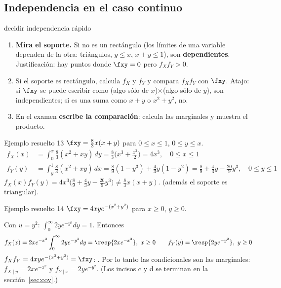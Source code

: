 \subsection{Independencia en el caso continuo}

\begin{receta}{decidir independencia r\'apido}
\begin{enumerate}
\item \textbf{Mira el soporte.} Si no es un rect\'angulo (los l\'imites de una variable dependen de la otra:
tri\'angulos, $y\le x$, $x+y\le1$), son \textbf{dependientes}. Justificaci\'on: hay puntos donde $\fxy=0$ pero $f_Xf_Y>0$.
\item Si el soporte es rect\'angulo, calcula $f_X$ y $f_Y$ y compara $f_Xf_Y$ con $\fxy$.
Atajo: si $\fxy$ se puede escribir como (algo s\'olo de $x$)$\times$(algo s\'olo de $y$), son independientes; si es una suma como $x+y$ o $x^2+y^2$, no.
\item En el examen \textbf{escribe la comparaci\'on}: calcula las marginales y muestra el producto.
\end{enumerate}
\end{receta}

\begin{ejemplo}{Ejemplo resuelto 13 }
$\fxy=\tfrac83x(x+y)$ para $0\le x\le1$, $0\le y\le x$.
\begin{align*}
f_X(x)&=\int_0^x\tfrac83(x^2+xy)\,dy=\tfrac83\Big(x^3+\tfrac{x^3}{2}\Big)=4x^3,\quad0\le x\le1\\
f_Y(y)&=\int_y^1\tfrac83(x^2+xy)\,dx=\tfrac89(1-y^3)+\tfrac43y(1-y^2)=\tfrac89+\tfrac43y-\tfrac{20}{9}y^3,\quad0\le y\le1
\end{align*}
$f_X(x)f_Y(y)=4x^3\big(\tfrac89+\tfrac43y-\tfrac{20}{9}y^3\big)\neq\tfrac83x(x+y)$. 
(adem\'as el soporte es triangular).
\end{ejemplo}

\begin{ejemplo}{Ejemplo resuelto 14 }
$\fxy=4xye^{-(x^2+y^2)}$ para $x\ge0$, $y\ge0$.

Con $u=y^2$: $\int_0^\infty 2ye^{-y^2}dy=1$. Entonces
\[
f_X(x)=2xe^{-x^2}\int_0^\infty2ye^{-y^2}dy=\resp{2xe^{-x^2}},\ x\ge0\qquad f_Y(y)=\resp{2ye^{-y^2}},\ y\ge0
\]
$f_Xf_Y=4xye^{-(x^2+y^2)}=\fxy$: . Por lo tanto las condicionales son las marginales:
$f_{X\mid y}=2xe^{-x^2}$ y $f_{Y\mid x}=2ye^{-y^2}$. (Los incisos c y d se terminan en la secci\'on~\ref{sec:cov}.)
\end{ejemplo}
